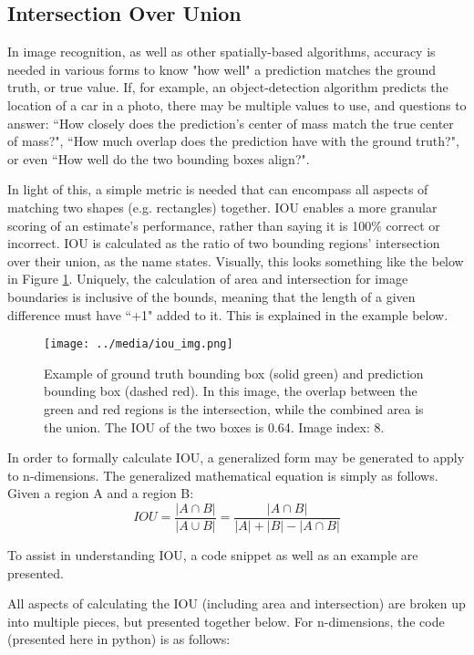 \subsection{Intersection Over Union}
In image recognition, as well as other spatially-based algorithms, accuracy is needed in various forms to know "how well" a prediction matches the ground truth, or true value. If, for example, an object-detection algorithm predicts the location of a car in a photo, there may be multiple values to use, and questions to answer: ``How closely does the prediction's center of mass match the true center of mass?", ``How much overlap does the prediction have with the ground truth?", or even ``How well do the two bounding boxes align?". 

In light of this, a simple metric is needed that can encompass all aspects of matching two shapes (e.g. rectangles) together. IOU enables a more granular scoring of an estimate's performance, rather than saying it is 100\% correct or incorrect. IOU is calculated as the ratio of two bounding regions' intersection over their union, as the name states. Visually, this looks something like the below in Figure \ref{iou_img}. Uniquely, the calculation of area and intersection for image boundaries is inclusive of the bounds, meaning that the length of a given difference must have ``+1" added to it. This is explained in the example below.

\begin{figure}[ht] %
    \texttt{[image: ../media/iou\_img.png]}
    \caption{Example of ground truth bounding box (solid green) and prediction bounding box (dashed red). In this image, the overlap between the green and red regions is the intersection, while the combined area is the union. The IOU of the two boxes is 0.64. Image index: 8.}
    \label{iou_img} %
\end{figure}

In order to formally calculate IOU, a generalized form may be generated to apply to n-dimensions. The generalized mathematical equation is simply as follows. Given a region A and a region B: 
\begin{equation}
IOU = \frac{|A\cap B|}{|A\cup B|} = \frac{|A\cap B|}{|A|+|B|- |A\cap B|}
\end{equation}

To assist in understanding IOU, a code snippet as well as an example are presented.

All aspects of calculating the IOU (including area and intersection) are broken up into multiple pieces, but presented together below. For n-dimensions, the code (presented here in python) is as follows: 



